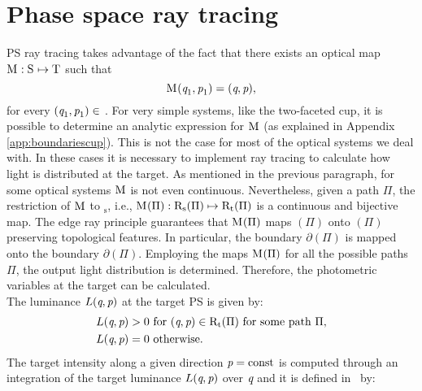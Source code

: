\section{Phase space ray tracing}\label{sec:PS_raytracing}
PS ray tracing takes advantage of the fact that there exists an optical map
$
\mathrm{M}_{\textit{}}: \mbox{$\textup{S}_{\textit{}}$} \mapsto \mbox{$\textup{T}_{\textit{}}$}
$
 such that
\begin{equation}\label{eq:map1}
\mathrm{M}_{\textit{}}(\textit{q}_1,\textit{p}_1)=(\textit{q},\textit{p}),
\end{equation} for every $(\textit{q}_1,\textit{p}_1)\in$ .
For very simple systems, like the two-faceted cup, it is possible to determine an analytic expression for $\mathrm{M}_{\textit{}}$ (as explained in Appendix \ref{app:boundariescup}).
This is not the case for most of the optical systems we deal with. In these cases it is necessary to implement ray tracing to calculate how light is distributed at the target.
As mentioned in the previous paragraph, for some optical systems $\mathrm{M}_{\textit{}}$ is not even continuous.
Nevertheless, given a path $\Pi$, the restriction of $\mathrm{M}_{\textit{}}$ to $_\textrm{s}$, 
i.e., $\mathrm{M}_{\textit{}}(\Pi): \mbox{$\textup{R}$}_\textrm{s}(\Pi)\mapsto 
\mbox{$\textup{R}$}_\textrm{t}(\Pi)$ is a continuous and bijective map. 
The edge ray principle guarantees that $\mathrm{M}_{\textit{}}(\Pi)$ maps $(\Pi)$ onto $(\Pi)$ preserving topological features. In particular, the boundary $\partial$$(\Pi)$ is mapped onto the boundary $\partial$$(\Pi)$. %
Employing the maps $\mathrm{M}_{\textit{}}(\Pi)$ for all the possible paths $\Pi$, the output light distribution is determined. Therefore, the photometric variables at the target can be calculated.
\\ \indent The luminance $L(\textit{q}, \textit{p})$ at the target PS is given by:
\begin{equation}
\begin{aligned}
\label{eq:PSluminance}
L(\variabile{q}, \variabile{p}) &> 0  \mbox{  for } (\variabile{q}, \variabile{p})\in \mbox{\insieme{R}}_\textrm{t}(\Pi) \mbox{ for some path } \Pi,\\ \vspace{0.5 cm}
L(\variabile{q}, \variabile{p}) &= 0  \mbox{  otherwise}.
\end{aligned}
\end{equation}
The target intensity along a given direction $\textit{p}=\textrm{const}$ is computed through an integration of the target luminance $L(\textit{q}, \textit{p})$ over $\textit{q}$ and it is defined in $\,$ by:

